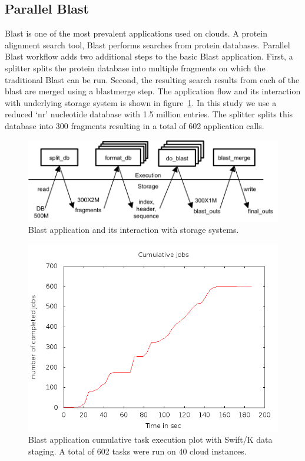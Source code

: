 \documentclass{sig-alternate}
\begin{document}
\subsection{Parallel Blast}
Blast is one of the most prevalent applications used on clouds. A protein
alignment search tool, Blast performs searches from protein databases. Parallel
Blast workflow adds two additional steps to the basic Blast application. First,
a splitter splits the protein database into multiple fragments on which the
traditional Blast can be run. Second, the resulting search results from each of
the blast are merged using a blastmerge step. The application flow and its
interaction with underlying storage system is shown in figure~\ref{fig_blast}.
In this study we use a reduced `nr' nucleotide database with 1.5 million
entries. The splitter splits this database into 300 fragments resulting in a
total of 602 application calls.

\begin{figure}[htb]
\begin{center}
\includegraphics[width=\linewidth]{figures/blast.png}
\caption{Blast application and its interaction with storage systems. 
\label{fig_blast}
}
\end{center}
\end{figure}

\begin{figure}[htb]
\begin{center}
\includegraphics[width=\linewidth]{plots/blast_40i_80c.png}
\caption{Blast application cumulative task execution plot with Swift/K data staging. A total of 602 tasks were run on 40 cloud instances. 
\label{fig_blast_k}
}
\end{center}
\end{figure}
\end{document}
